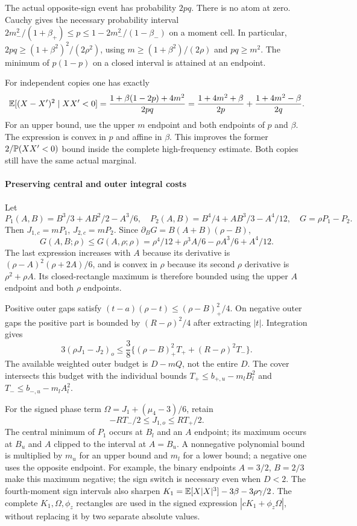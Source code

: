 The actual opposite-sign event has probability $2pq$.
There is no atom at zero. Cauchy gives the necessary probability interval
$2m_-^2/(1+\beta_+)\le p\le1-2m_-^2/(1-\beta_-)$ on a moment cell.
In particular, $2pq\ge(1+\beta^2)^2/(2\rho^2)$, using
$m\ge(1+\beta^2)/(2\rho)$ and $pq\ge m^2$. The minimum of
$p(1-p)$ on a closed interval is attained at an endpoint.

For independent copies one has exactly
\[
 \mathbb E[(X-X')^2\mid XX'<0]
 =\frac{1+\beta(1-2p)+4m^2}{2pq}
 =\frac{1+4m^2+\beta}{2p}
  +\frac{1+4m^2-\beta}{2q}.
\]
For an upper bound, use the upper $m$ endpoint and both endpoints of
$p$ and $\beta$. The expression is convex in $p$ and affine in $\beta$.
This improves the former $2/\mathbb P(XX'<0)$ bound inside the complete high-frequency
estimate. Both copies still have the same actual marginal.

\paragraph{Preserving central and outer integral costs}
Let
\[
 P_1(A,B)=B^3/3+AB^2/2-A^3/6,\quad
 P_2(A,B)=B^4/4+AB^3/3-A^4/12,\quad G=\rho P_1-P_2.
\]
Then $J_{1,c}=mP_1$, $J_{2,c}=mP_2$. Since
$\partial_BG=B(A+B)(\rho-B)$,
\[
 G(A,B;\rho)\le G(A,\rho;\rho)
 =\rho^4/12+\rho^3A/6-\rho A^3/6+A^4/12.
\]
The last expression increases with $A$ because its derivative is
$(\rho-A)^2(\rho+2A)/6$, and is convex in $\rho$ because its second
$\rho$ derivative is $\rho^2+\rho A$. Its closed-rectangle maximum is
therefore bounded using the upper $A$ endpoint and both $\rho$ endpoints.

Positive outer gaps satisfy
$(t-a)(\rho-t)\le(\rho-B)_+^2/4$. On negative outer gaps the positive
part is bounded by $(R-\rho)^2/4$ after extracting $|t|$.
Integration gives
\[
 3(\rho J_1-J_2)_o
 \le\frac38\{(\rho-B)_+^2T_++(R-\rho)^2T_-\}.
\]
The available weighted outer budget is $D-mQ$, not the entire $D$.
The cover intersects this budget with the individual bounds
$T_+\le b_{+,u}-m_lB_l^2$ and $T_-\le b_{-,u}-m_lA_l^2$.

For the signed phase term $\Omega=J_1+(\mu_4-3)/6$, retain
\[
 -RT_-/2\le J_{1,o}\le RT_+/2.
\]
The central minimum of $P_1$ occurs at $B_l$ and an $A$ endpoint;
its maximum occurs at $B_u$ and $A$ clipped to the interval at $A=B_u$.
A nonnegative polynomial bound is multiplied by $m_u$ for an upper
bound and $m_l$ for a lower bound; a negative one uses the opposite
endpoint. For example, the binary endpoints $A=3/2$, $B=2/3$ make this
maximum negative; the sign switch is necessary even when $D<2$.
The fourth-moment sign intervals also sharpen
$K_1=\mathbb E[X|X|^3]-3\beta-3\rho\gamma/2$.
The complete $K_1,\Omega,\phi_z$ rectangles are used in the signed expression
$|cK_1+\phi_z\Omega|$, without replacing it by two separate absolute values.



